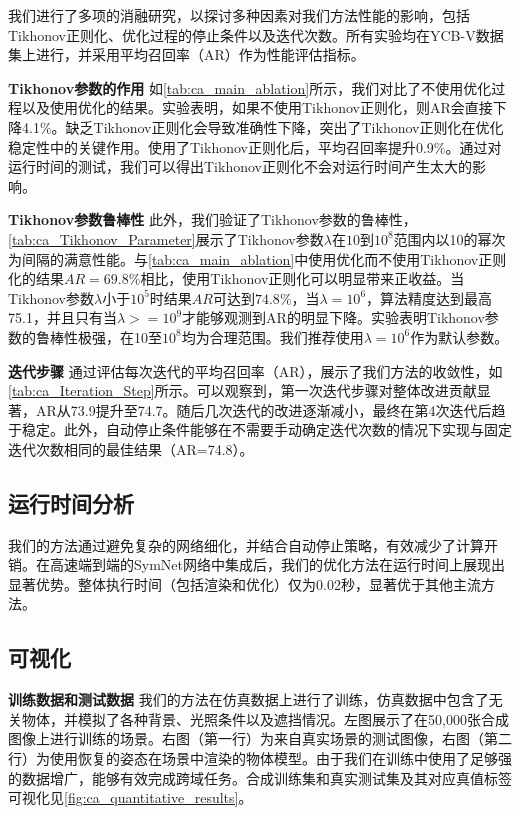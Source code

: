 我们进行了多项的消融研究，以探讨多种因素对我们方法性能的影响，包括Tikhonov正则化、优化过程的停止条件以及迭代次数。所有实验均在YCB-V数据集上进行，并采用平均召回率（AR）作为性能评估指标。

\textbf{Tikhonov参数的作用 } 如\autoref{tab:ca_main_ablation}所示，我们对比了不使用优化过程以及使用优化的结果。实验表明，如果不使用Tikhonov正则化，则AR会直接下降4.1\%。缺乏Tikhonov正则化会导致准确性下降，突出了Tikhonov正则化在优化稳定性中的关键作用。使用了Tikhonov正则化后，平均召回率提升0.9\%。通过对运行时间的测试，我们可以得出Tikhonov正则化不会对运行时间产生太大的影响。



\textbf{Tikhonov参数鲁棒性 } 此外，我们验证了Tikhonov参数的鲁棒性，\autoref{tab:ca_Tikhonov_Parameter}展示了Tikhonov参数$\lambda$在$10$到$10^8$范围内以10的幂次为间隔的满意性能。与\autoref{tab:ca_main_ablation}中使用优化而不使用Tikhonov正则化的结果$AR=69.8\%$相比，使用Tikhonov正则化可以明显带来正收益。当Tikhonov参数$\lambda$小于$10^5$时结果$AR$可达到$74.8\%$，当$\lambda=10^6$，算法精度达到最高75.1，并且只有当$\lambda>=10^9$才能够观测到AR的明显下降。实验表明Tikhonov参数的鲁棒性极强，在10至$10^8$均为合理范围。我们推荐使用$\lambda=10^6$作为默认参数。



\textbf{迭代步骤 } 通过评估每次迭代的平均召回率（AR），展示了我们方法的收敛性，如\autoref{tab:ca_Iteration_Step}所示。可以观察到，第一次迭代步骤对整体改进贡献显著，AR从73.9提升至74.7。随后几次迭代的改进逐渐减小，最终在第4次迭代后趋于稳定。此外，自动停止条件能够在不需要手动确定迭代次数的情况下实现与固定迭代次数相同的最佳结果（AR=74.8）。



\subsection{运行时间分析}

我们的方法通过避免复杂的网络细化，并结合自动停止策略，有效减少了计算开销。在高速端到端的SymNet网络中集成后，我们的优化方法在运行时间上展现出显著优势。整体执行时间（包括渲染和优化）仅为0.02秒，显著优于其他主流方法。

\subsection{可视化}
\par \textbf{训练数据和测试数据 } 我们的方法在仿真数据上进行了训练，仿真数据中包含了无关物体，并模拟了各种背景、光照条件以及遮挡情况。左图展示了在50,000张合成图像上进行训练的场景。右图（第一行）为来自真实场景的测试图像，右图（第二行）为使用恢复的姿态在场景中渲染的物体模型。由于我们在训练中使用了足够强的数据增广，能够有效完成跨域任务。合成训练集和真实测试集及其对应真值标签可视化见\autoref{fig:ca_quantitative_results}。


